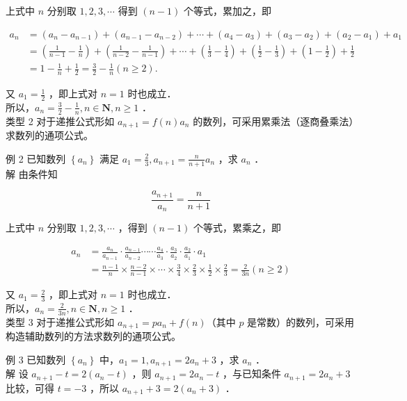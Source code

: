 \documentclass[10pt]{article}
\begin{document}
上式中 \(n\) 分别取 \(1,2,3, \cdots\) 得到 \((n-1)\) 个等式，累加之，即

\[
\begin{aligned}
a_{n} & =\left(a_{n}-a_{n-1}\right)+\left(a_{n-1}-a_{n-2}\right)+\cdots+\left(a_{4}-a_{3}\right)+\left(a_{3}-a_{2}\right)+\left(a_{2}-a_{1}\right)+a_{1} \\
& =\left(\frac{1}{n-1}-\frac{1}{n}\right)+\left(\frac{1}{n-2}-\frac{1}{n-1}\right)+\cdots+\left(\frac{1}{3}-\frac{1}{4}\right)+\left(\frac{1}{2}-\frac{1}{3}\right)+\left(1-\frac{1}{2}\right)+\frac{1}{2} \\
& =1-\frac{1}{n}+\frac{1}{2}=\frac{3}{2}-\frac{1}{n}(n \geqslant 2) .
\end{aligned}
\]

又 \(a_{1}=\frac{1}{2}\) ，即上式对 \(n=1\) 时也成立．\\
所以，\(a_{n}=\frac{3}{2}-\frac{1}{n}, n \in \mathbf{N}, n \geqslant 1\) ．\\
类型 2 对于递推公式形如 \(a_{n+1}=f(n) a_{n}\) 的数列，可采用累乘法（逐商叠乘法）求数列的通项公式。

例 2 已知数列 \(\left\{a_{n}\right\}\) 满足 \(a_{1}=\frac{2}{3}, a_{n+1}=\frac{n}{n+1} a_{n}\) ，求 \(a_{n}\) ．\\
解 由条件知

\[
\frac{a_{n+1}}{a_{n}}=\frac{n}{n+1}
\]

上式中 \(n\) 分别取 \(1,2,3, \cdots\) ，得到 \((n-1)\) 个等式，累乘之，即

\[
\begin{aligned}
a_{n} & =\frac{a_{n}}{a_{n-1}} \cdot \frac{a_{n-1}}{a_{n-2}} \cdots \cdots \frac{a_{4}}{a_{3}} \cdot \frac{a_{3}}{a_{2}} \cdot \frac{a_{2}}{a_{1}} \cdot a_{1} \\
& =\frac{n-1}{n} \times \frac{n-2}{n-1} \times \cdots \times \frac{3}{4} \times \frac{2}{3} \times \frac{1}{2} \times \frac{2}{3}=\frac{2}{3 n}(n \geqslant 2)
\end{aligned}
\]

又 \(a_{1}=\frac{2}{3}\) ，即上式对 \(n=1\) 时也成立．\\
所以，\(a_{n}=\frac{2}{3 n}, n \in \mathbf{N}, n \geqslant 1\) ．\\
类型 3 对于递推公式形如 \(a_{n+1}=p a_{n}+f(n)\)（其中 \(p\) 是常数）的数列，可采用构造辅助数列的方法求数列的通项公式。

例 3 已知数列 \(\left\{a_{n}\right\}\) 中，\(a_{1}=1, a_{n+1}=2 a_{n}+3\) ，求 \(a_{n}\) ．\\
解 设 \(a_{n+1}-t=2\left(a_{n}-t\right)\) ，则 \(a_{n+1}=2 a_{n}-t\) ，与已知条件 \(a_{n+1}=2 a_{n}+3\) 比较，可得 \(t=-3\) ，所以 \(a_{n+1}+3=2\left(a_{n}+3\right)\) ．
\end{document}
